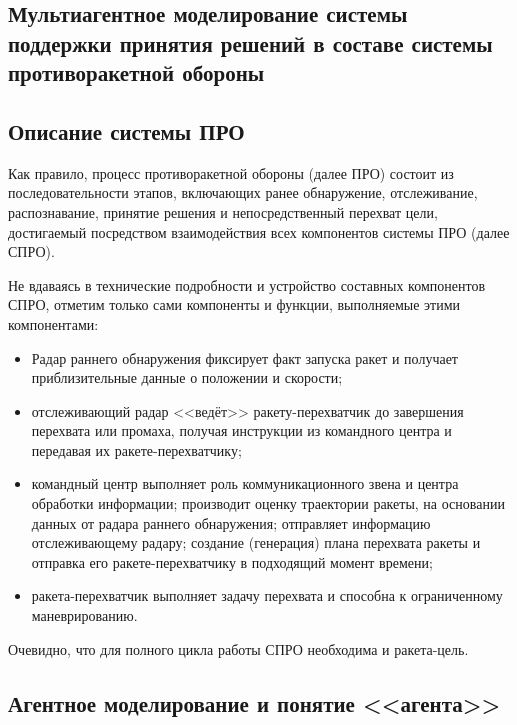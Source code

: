 \parindent=1cm %

\begin{center}
		
		\section{Мультиагентное моделирование системы поддержки принятия решений в составе системы противоракетной обороны}
		
\end{center}

\subsection{Описание системы ПРО} 

Как правило, процесс противоракетной обороны (далее ПРО) состоит из последовательности этапов, включающих ранее обнаружение, отслеживание, распознавание, принятие решения и непосредственный перехват цели, достигаемый посредством взаимодействия всех компонентов системы ПРО (далее СПРО). 

Не вдаваясь в технические подробности и устройство составных компонентов СПРО, отметим только сами компоненты и функции, выполняемые этими компонентами:

\begin{itemize}
	\item Радар раннего обнаружения фиксирует факт запуска ракет и получает приблизительные данные о положении и скорости;
	\item отслеживающий радар <<ведёт>> ракету-перехватчик до завершения перехвата или промаха, получая инструкции из командного центра и передавая их ракете-перехватчику;
	\item командный центр выполняет роль коммуникационного звена и центра обработки информации; производит оценку траектории ракеты, на основании  данных от радара раннего обнаружения; отправляет информацию отслеживающему радару;  создание (генерация) плана перехвата ракеты и отправка его ракете-перехватчику в подходящий момент времени;
	\item ракета-перехватчик выполняет задачу перехвата и способна к ограниченному маневрированию.
\end{itemize} 

Очевидно, что для полного цикла работы СПРО необходима и ракета-цель. 


\subsection{Агентное моделирование и понятие <<агента>>}


